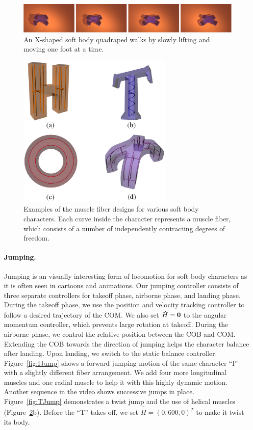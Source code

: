 \begin{figure}[t]
\centering
\includegraphics[width=\textwidth]{figures/XWalk.eps}
\caption{An X-shaped soft body quadraped walks by slowly lifting and moving one foot at a time.}
\label{fig:XWalk}
\end{figure}


\begin{figure}[!b]
\centering
\includegraphics[width=3in]{figures/muscles2.eps}
\caption{Examples of the muscle fiber designs for various soft body characters. Each curve inside the character represents a muscle fiber, which consists of a number of independently contracting degrees of freedom.}
\label{fig:muscles}
\end{figure}

\paragraph{Jumping.} Jumping is an visually interesting form of
locomotion for soft body characters as it is often seen in cartoons
and animations. Our jumping controller consists of three separate
controllers for takeoff phase, airborne phase, and landing
phase. During the takeoff phase, we use the position and velocity
tracking controller to follow a desired trajectory of the COM. We also
set $\bar{\dot{H}}=\mathbf{0}$ to the angular momentum controller, which
prevents large rotation at takeoff.  During the airborne phase, we control the relative
position between the COB and COM. Extending the COB towards the
direction of jumping helps the character balance after landing. Upon
landing, we switch to the static balance controller.
Figure~\ref{fig:IJump} shows a forward jumping motion of the same
character ``I'' with a slightly different fiber arrangement.
We add four more longitudinal muscles and one radial muscle to help it with this highly dynamic motion.
Another sequence in the video shows successive jumps in place.
Figure~\ref{fig:TJump} demonstrates
a twist jump and the use of helical muscles
(Figure~\ref{fig:muscles}b).  Before the ``T'' takes off, we set
$\bar{\dot{H}}=(0, 600, 0)^T$ to make it twist its body.

